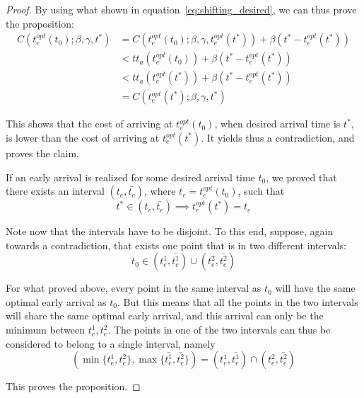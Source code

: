 \begin{proof}
  By using what shown in equation~\eqref{eq:shifting_desired}, we can thus prove the proposition:
  \begin{align*}
    C(t_e^{opt}(t_0); \beta, \gamma, t^*) & = C(t_e^{opt}(t_0); \beta, \gamma, t_e^{opt}(t^*)) + \beta(t^* - t_e^{opt}(t^*)) \\
                                          & < tt_a(t_e^{opt}(t_0)) + \beta(t^* - t_e^{opt}(t^*)) \\
                                          & < tt_a(t_e^{opt}(t^*)) + \beta(t^* - t_e^{opt}(t^*)) \\
                                          & = C(t_e^{opt}(t^*); \beta, \gamma, t^*)
  \end{align*}

  This shows that the cost of arriving at \(t_e^{opt}(t_0)\),
  when desired arrival time is \(t^*\),
  is lower than the cost of arriving at \(t_e^{opt}(t^*)\).
  It yields thus a contradiction,
  and proves the claim.

  If an early arrival is realized for some desired arrival time \(t_0\),
  we proved that there exists an interval \((t_e, \bar{t_e})\),
  where \(t_e = t_e^{opt}(t_0)\),
  such that
  \begin{equation*}
    t^* \in (t_e, \bar{t_e}) \implies t_e^{opt}(t^*) = t_e
  \end{equation*}

  Note now that the intervals have to be disjoint.
  To this end, suppose, again towards a contradiction,
  that exists one point that is in two different intervals:
  \begin{equation*}
    t_0 \in (t_e^1, \bar{t_e^1}) \cup (t_e^2, \bar{t_e^2})
  \end{equation*}

  For what proved above,
  every point in the same interval as \(t_0\) will have the same optimal early arrival as \(t_0\).
  But this means that all the points in the two intervals will share the same optimal early arrival,
  and this arrival can only be the minimum between \(t_e^1, t_e^2\).
  The points in one of the two intervals can thus be considered to belong to a single interval,
  namely
  \begin{equation*}
    (\min\{t_e^1, t_e^2\}, \max\{\bar{t_e^1}, \bar{t_e^2}\}) = (t_e^1, \bar{t_e^1}) \cap (t_e^2, \bar{t_e^2})
  \end{equation*}

  This proves the proposition.
\end{proof}

